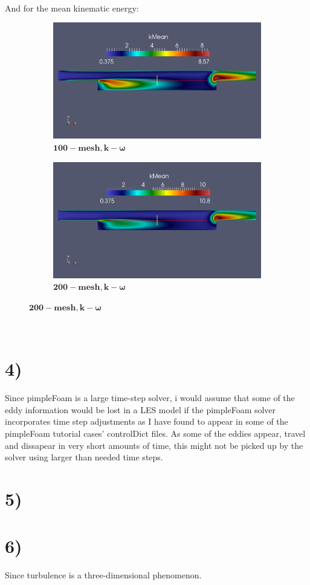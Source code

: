 \documentclass[a4paper,english,11pt,twoside]{article}
\begin{document}
\\
And for the mean kinematic energy:\\
\begin{figure}[h!]
	\begin{subfigure}{0.5\textwidth}
		\includegraphics[width=0.95\linewidth]{simple_ko_10_mean_k.png}
		\caption{$\mathbf{ 100-mesh, k-\omega}$}
	\end{subfigure}
	\begin{subfigure}{0.5\textwidth}
		\includegraphics[width=0.95\linewidth]{simple_ko_20_mean_k.png}
		\caption{$\mathbf{ 200-mesh, k-\omega}$}
	\end{subfigure}
\end{figure}
\\
\section*{4)}
Since pimpleFoam is a large time-step solver, i would assume that some of the eddy information would be lost in a LES model if the pimpleFoam solver incorporates time step adjustments as I have found to appear in some of the pimpleFoam tutorial cases' controlDict files. As some of the eddies appear, travel and dissapear in very short amounts of time, this might not be picked up by the solver using larger than needed time steps.
\section*{5)}
\section*{6)}
Since turbulence is a three-dimensional phenomenon.
 
\end{document}
